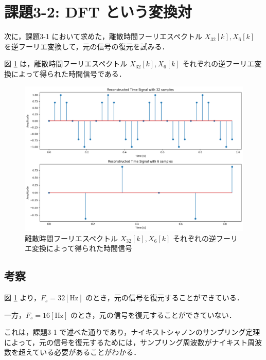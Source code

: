 \documentclass[fleqn, a4paper. 12pt]{jsarticle}
\begin{document}
    \newpage

    \section*{課題3-2: DFT という変換対}

    次に，課題3-1 において求めた，離散時間フーリエスペクトル $X_{32}[k], X_{6}[k]$ を逆フーリエ変換して，元の信号の復元を試みる．

    図 \ref{fig:fig10} は，離散時間フーリエスペクトル $X_{32}[k], X_{6}[k]$ それぞれの逆フーリエ変換によって得られた時間信号である．
  
    \begin{figure}[!h]
      \centering
      \includegraphics[width=1\textwidth]{fig_3_2.png}
      \caption{離散時間フーリエスペクトル $X_{32}[k], X_{6}[k]$ それぞれの逆フーリエ変換によって得られた時間信号}
      \label{fig:fig10}
    \end{figure}
  
    \subsection*{考察}
  
      図 \ref{fig:fig10} より，$F_s = 32 [\mathrm{Hz}]$ のとき，元の信号を復元することができている．
  
      一方，$F_s = 16 [\mathrm{Hz}]$ のとき，元の信号を復元することができていない．
  
      これは，課題3-1 で述べた通りであり，ナイキストシャノンのサンプリング定理によって，元の信号を復元するためには，サンプリング周波数がナイキスト周波数を超えている必要があることがわかる．

    \newpage
\end{document}
